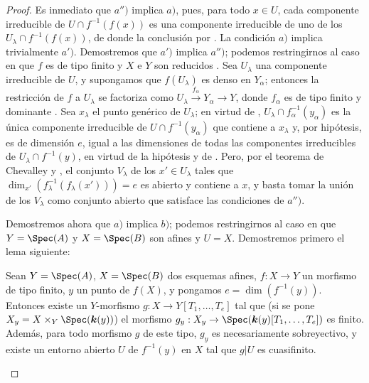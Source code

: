 \begin{proof}
Es inmediato que $a'')$ implica $a)$, pues, para todo $x\in U$, cada componente irreducible de $U\cap f^{-1}(f(x))$ es una componente irreducible de uno de los $U_\lambda\cap f^{-1}(f(x))$, de donde la conclusión por .
La condición $a)$ implica trivialmente $a')$.
Demostremos que $a')$ implica $a'')$; podemos restringirnos al caso en que $f$ es de tipo finito y $X$ e $Y$ son reducidos .
Sea $U_\lambda$ una componente irreducible de $U$, y supongamos que $f(U_\lambda)$ es denso en $Y_\alpha$; entonces la restricción de $f$ a $U_\lambda$ se factoriza como $U_\lambda\xrightarrow{f_\alpha}Y_\alpha\longrightarrow Y$, donde $f_\alpha$ es de tipo finito y dominante .
Sea $x_\lambda$ el punto genérico de $U_\lambda$; en virtud de , $U_\lambda\cap f_\alpha^{-1}(y_\alpha)$ es la única componente irreducible de $U\cap f^{-1}(y_\alpha)$ que contiene a $x_\lambda$ y, por hipótesis, es de dimensión $e$, igual a las dimensiones de todas las componentes irreducibles de $U_\lambda\cap f^{-1}(y)$, en virtud de la hipótesis y de .
Pero, por el teorema de Chevalley  y , el conjunto $V_\lambda$ de los $x'\in U_\lambda$ tales que $\dim_{x'}(f_\lambda^{-1}(f_\lambda(x')))=e$ es abierto y contiene a $x$, y basta tomar la unión de los $V_\lambda$ como conjunto abierto que satisface las condiciones de $a'')$.

Demostremos ahora que $a)$ implica $b)$; podemos restringirnos al caso en que $Y=\Spec(A)$ y $X=\Spec(B)$ son afines y $U=X$.
Demostremos primero el lema siguiente:

\begin{lemma}[13.3.1.1]
\label{IV.13.3.1.1}
Sean $Y=\Spec(A)$, $X=\Spec(B)$ dos esquemas afines, $f:X\to Y$ un morfismo de tipo finito, $y$ un punto de $f(X)$, y pongamos $e=\dim(f^{-1}(y))$.
Entonces existe un $Y$-morfismo $g:X\to Y[T_1,\ldots,T_e]$ tal que (si se pone $X_y=X\times_Y\Spec(\boldsymbol k(y))$) el morfismo $g_y:X_y\to\Spec(\boldsymbol k(y)[T_1,\ldots,T_e])$ es finito.
Además, para todo morfismo $g$ de este tipo, $g_y$ es necesariamente sobreyectivo, y existe un entorno abierto $U$ de $f^{-1}(y)$ en $X$ tal que $g|U$ es cuasifinito.
\end{lemma}


\end{proof}
